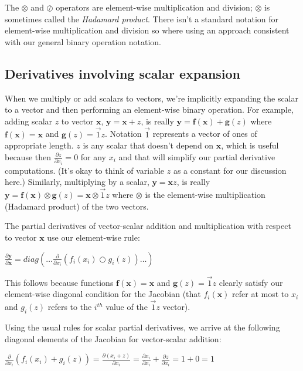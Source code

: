 \documentclass[11pt]{article}
\begin{document}
The $\otimes$ and $\oslash$ operators are element-wise multiplication and division; $\otimes$ is sometimes called the {\em Hadamard product}. There isn't a standard notation for element-wise multiplication and division so where using an approach consistent with our general binary operation notation.

\subsection{Derivatives involving scalar expansion}

When we multiply or add scalars to vectors, we're implicitly expanding the scalar to a vector and then performing an element-wise binary operation. For example, adding scalar $z$  to vector $\mathbf{x}$, $\mathbf{y} = \mathbf{x} + z$,
is really
$\mathbf{y} = \mathbf{f(x)} + \mathbf{g}(z)$ where $\mathbf{f(x)} = \mathbf{x}$ and $\mathbf{g}(z) = \vec{1} z$. Notation $\vec{1}$ represents a vector of ones of appropriate length.  $z$ is any scalar that doesn't depend on $\mathbf{x}$, which is useful because then $\frac{\partial z}{\partial x_i} = 0$ for any $x_i$ and that will simplify our partial derivative computations. (It's okay to think of variable $z$ as a constant for our discussion here.)  Similarly, multiplying by a scalar, $\mathbf{y} = \mathbf{x} z$, is really $\mathbf{y} = \mathbf{f(x)} \otimes \mathbf{g}(z) = \mathbf{x} \otimes \vec{1}z$ where $\otimes$ is the element-wise  multiplication (Hadamard product) of the two vectors.

The partial derivatives of vector-scalar addition and multiplication with respect to vector $\mathbf{x}$ use our element-wise rule:

$\frac{\partial \mathbf{y}}{\partial \mathbf{x}} = diag \left( \ldots \frac{\partial}{\partial x_i} ( f_i(x_i) \bigcirc g_i(z) ) \ldots \right)$

This follows because functions $\mathbf{f(x)} = \mathbf{x}$ and $\mathbf{g}(z) = \vec{1} z$ clearly satisfy our element-wise diagonal condition for the Jacobian (that $f_i(\mathbf{x})$ refer at most to $x_i$ and $g_i(z)$ refers to the $i^{th}$ value of the $\vec{1}z$ vector). 

Using the usual rules for scalar partial derivatives, we arrive at the following diagonal elements of the Jacobian for vector-scalar addition:
 
$\frac{\partial}{\partial x_i} ( f_i(x_i) + g_i(z) ) = \frac{\partial (x_i + z)}{\partial x_i} = \frac{\partial x_i}{\partial x_i} + \frac{\partial z}{\partial x_i} = 1 + 0 = 1$
\end{document}
